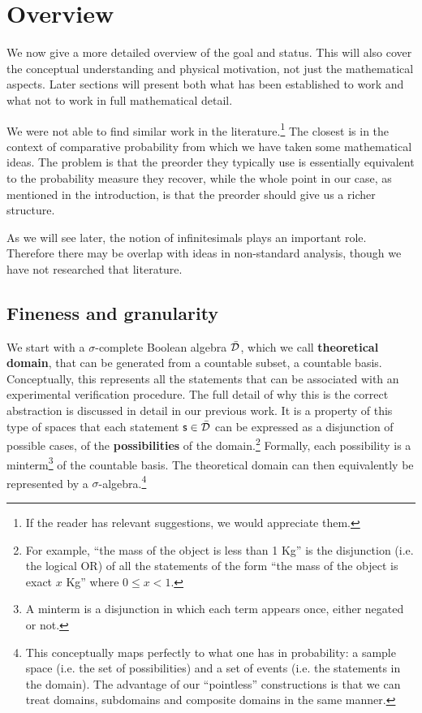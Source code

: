 \documentclass[11pt]{article}
\begin{document}
\section{Overview}

We now give a more detailed overview of the goal and status. This will also cover the conceptual understanding and physical motivation, not just the mathematical aspects. Later sections will present both what has been established to work and what not to work in full mathematical detail.

We were not able to find similar work in the literature.\footnote{If the reader has relevant suggestions, we would appreciate them.} The closest is in the context of comparative probability\cite{definetti, villegas} from which we have taken some mathematical ideas. The problem is that the preorder they typically use is essentially equivalent to the probability measure they recover, while the whole point in our case, as mentioned in the introduction, is that the preorder should give us a richer structure.

As we will see later, the notion of infinitesimals plays an important role. Therefore there may be overlap with ideas in non-standard analysis, though we have not researched that literature.

\subsection{Fineness and granularity}

We start with a $\sigma$-complete Boolean algebra $\bar{\mathcal{D}}$, which we call \textbf{theoretical domain}, that can be generated from a countable subset, a countable basis. Conceptually, this represents all the statements that can be associated with an experimental verification procedure. The full detail of why this is the correct abstraction is discussed in detail in our previous work.\cite{AoPBook} It is a property of this type of spaces that each statement $\mathsf{s} \in \bar{\mathcal{D}}$ can be expressed as a disjunction of possible cases, of the  \textbf{possibilities} of the domain.\footnote{For example, ``the mass of the object is less than 1 Kg'' is the disjunction (i.e. the logical OR) of all the statements of the form ``the mass of the object is exact $x$ Kg'' where $0 \leq x < 1$.} Formally, each possibility is a minterm\footnote{A minterm is a disjunction in which each term appears once, either negated or not.} of the countable basis. The theoretical domain can then equivalently be represented by a $\sigma$-algebra.\footnote{This conceptually maps perfectly to what one has in probability: a sample space (i.e. the set of possibilities) and a set of events (i.e. the statements in the domain). The advantage of our ``pointless'' constructions is that we can treat domains, subdomains and composite domains in the same manner.}
\end{document}
